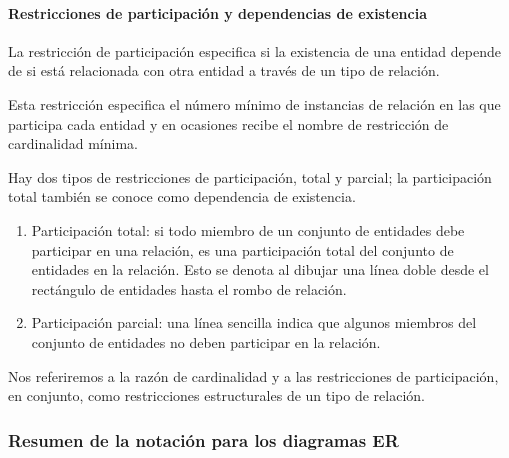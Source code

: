 \paragraph*{Restricciones de participación y dependencias de existencia}
La restricción de participación especifica si la existencia de una entidad depende de si está relacionada con otra entidad a través de un tipo de relación.


Esta restricción especifica el número mínimo de instancias de relación en las que participa cada entidad y en ocasiones recibe el nombre de restricción de cardinalidad mínima.


Hay dos tipos de restricciones de participación, total y parcial; la participación total también se conoce como dependencia de existencia.

\begin{enumerate}
    \item Participación total: si todo miembro de un conjunto de entidades debe participar en una relación, es una participación total del conjunto de entidades en la relación. Esto se denota al dibujar una línea doble desde el rectángulo de entidades hasta el rombo de relación.
    \item Participación parcial: una línea sencilla indica que algunos miembros del conjunto de entidades no deben participar en la relación.
    \end{enumerate}

Nos referiremos a la razón de cardinalidad y a las restricciones de participación, en conjunto, como restricciones estructurales de un tipo de relación.





\subsubsection{Resumen de la notación para los diagramas ER}

